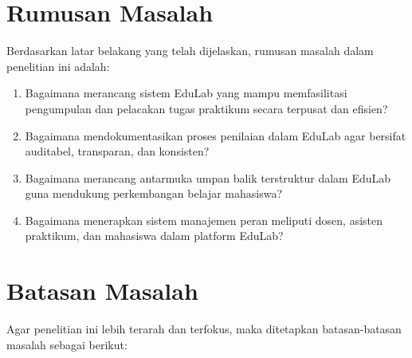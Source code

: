 \documentclass[12pt,a4paper,twoside]{report}
\begin{document}
\section{Rumusan Masalah}
Berdasarkan latar belakang yang telah dijelaskan, rumusan masalah dalam penelitian ini adalah:
\begin{enumerate}
    \item Bagaimana merancang sistem EduLab yang mampu memfasilitasi pengumpulan dan pelacakan tugas praktikum secara terpusat dan efisien?
    \item Bagaimana mendokumentasikan proses penilaian dalam EduLab agar bersifat auditabel, transparan, dan konsisten?
    \item Bagaimana merancang antarmuka umpan balik terstruktur dalam EduLab guna mendukung perkembangan belajar mahasiswa?
    \item Bagaimana menerapkan sistem manajemen peran meliputi dosen, asisten praktikum, dan mahasiswa dalam platform EduLab?
\end{enumerate}
\section{Batasan Masalah}

Agar penelitian ini lebih terarah dan terfokus, maka ditetapkan batasan-batasan masalah sebagai berikut:
\end{document}
